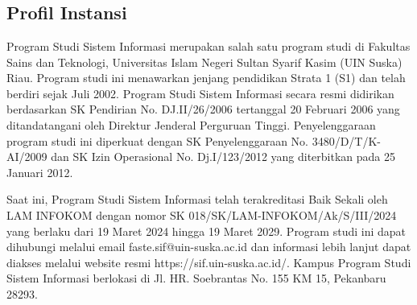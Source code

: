 %
%
%
%

\chapter{\babDua}


\section{Profil Instansi}
Program Studi Sistem Informasi merupakan salah satu program studi di Fakultas Sains dan Teknologi, Universitas Islam Negeri Sultan Syarif Kasim (UIN Suska) Riau. Program studi ini menawarkan jenjang pendidikan Strata 1 (S1) dan telah berdiri sejak Juli 2002. Program Studi Sistem Informasi secara resmi didirikan berdasarkan SK Pendirian No. DJ.II/26/2006 tertanggal 20 Februari 2006 yang ditandatangani oleh Direktur Jenderal Perguruan Tinggi. Penyelenggaraan program studi ini diperkuat dengan SK Penyelenggaraan No. 3480/D/T/K-AI/2009 dan SK Izin Operasional No. Dj.I/123/2012 yang diterbitkan pada 25 Januari 2012.

Saat ini, Program Studi Sistem Informasi telah terakreditasi Baik Sekali oleh LAM INFOKOM dengan nomor SK 018/SK/LAM-INFOKOM/Ak/S/III/2024 yang berlaku dari 19 Maret 2024 hingga 19 Maret 2029. Program studi ini dapat dihubungi melalui email faste.sif@uin-suska.ac.id dan informasi lebih lanjut dapat diakses melalui website resmi https://sif.uin-suska.ac.id/. Kampus Program Studi Sistem Informasi berlokasi di Jl. HR. Soebrantas No. 155 KM 15, Pekanbaru 28293.


